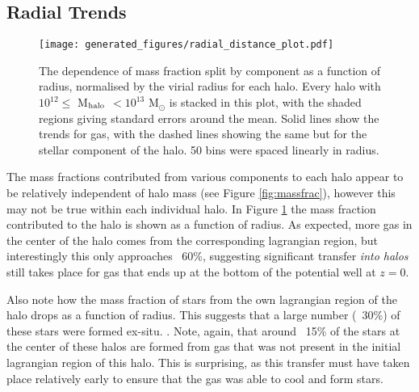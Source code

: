 \subsection{Radial Trends}

\begin{figure} \centering
	\texttt{[image: generated\_figures/radial\_distance\_plot.pdf]}
	\caption{The dependence of mass fraction split by component as a
	function of radius, normalised by the virial radius for each halo.
	Every halo with $10^{12} \leq $ M$_{\rm halo}$ $ < 10^{13}$ M$_\odot$
	is stacked in this plot, with the shaded regions giving standard errors
	around the mean. Solid lines show the trends for gas, with the dashed
	lines showing the same but for the stellar component of the halo. 50
	bins were spaced linearly in radius.} \label{fig:radialmassfrac}
\end{figure}

The mass fractions contributed from various components to each halo appear to
be relatively independent of halo mass (see Figure \ref{fig:massfrac}), however
this may not be true within each individual halo. In Figure
\ref{fig:radialmassfrac} the mass fraction contributed to the halo is shown as
a function of radius. As expected, more gas in the center of the halo comes
from the corresponding lagrangian region, but interestingly this only
approaches ~60\%, suggesting significant transfer \emph{into halos} still takes
place for gas that ends up at the bottom of the potential well at $z=0$.

Also note how the mass fraction of stars from the own lagrangian region of the
halo drops as a function of radius. This suggests that a large number (~30\%)
of these stars were formed ex-situ. . Note, again, that
around ~15\% of the stars at the center of these halos are formed from gas that
was not present in the initial lagrangian region of this halo. This is
surprising, as this transfer must have taken place relatively early to ensure
that the gas was able to cool and form stars.
